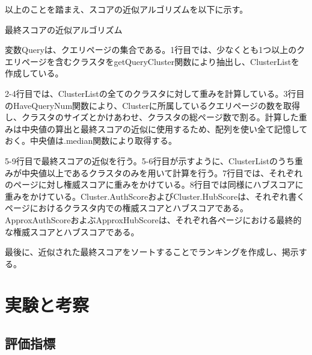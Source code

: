 \documentclass[a4paper,11pt]{jreport}
\begin{document}
\newpage

以上のことを踏まえ、スコアの近似アルゴリズムを以下に示す。

\begin{algorithm}
\caption{最終スコアの近似アルゴリズム}
\begin{algorithmic}[1]

\ENDFOR
{}
\ENDIF
\ENDFOR
\end{algorithmic}
\end{algorithm}

変数Queryは、クエリページの集合である。1行目では、少なくとも1つ以上のクエリページを含むクラスタをgetQueryCluster関数により抽出し、ClusterListを作成している。

2-4行目では、ClusterListの全てのクラスタに対して重みを計算している。3行目のHaveQueryNum関数により、Clusterに所属しているクエリページの数を取得し、クラスタのサイズとかけあわせ、クラスタの総ページ数で割る。計算した重みは中央値の算出と最終スコアの近似に使用するため、配列を使い全て記憶しておく。中央値は.median関数により取得する。

5-9行目で最終スコアの近似を行う。5-6行目が示すように、ClusterListのうち重みが中央値以上であるクラスタのみを用いて計算を行う。7行目では、それぞれのページに対し権威スコアに重みをかけている。8行目では同様にハブスコアに重みをかけている。Cluster.AuthScoreおよびCluster.HubScoreは、それぞれ書くページにおけるクラスタ内での権威スコアとハブスコアである。ApproxAuthScoreおよぶApproxHubScoreは、それぞれ各ページにおける最終的な権威スコアとハブスコアである。

最後に、近似された最終スコアをソートすることでランキングを作成し、掲示する。

\chapter{実験と考察}

\section{評価指標}
\end{document}
